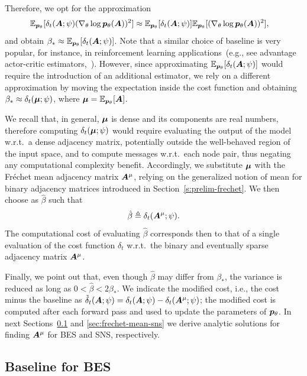 Therefore, we opt for the approximation  
\begin{align}
    \mathbb{E}_{{\bm{p}}_\theta}[\delta_t({\bm{A}};\psi)(\nabla_\theta\log{{\bm{p}}_\theta}({\bm{A}}))^{ 2}] 
    &\approx 
    \mathbb{E}_{{\bm{p}}_\theta}[\delta_t({\bm{A}};\psi)]\mathbb{E}_{{\bm{p}}_\theta}[(\nabla_\theta\log{{\bm{p}}_\theta}({\bm{A}}))^{ 2}],
\end{align}
and obtain $\beta_*\approx\mathbb{E}_{{\bm{p}}_\theta}[\delta_t({\bm{A}};\psi)]$. Note that a similar choice of baseline is very popular, for instance, in reinforcement learning applications~(e.g., see advantage actor-critic estimators,~\citealt{sutton1999policy, mnih2016asynchronous}). However, since approximating $\mathbb{E}_{{\bm{p}}_\theta}[\delta_t({\bm{A}};\psi)]$ would require the introduction of an additional estimator, we rely on a different approximation by moving the expectation inside the cost function and obtaining $\beta_*\approx\delta_t(\boldsymbol{\mu};\psi)$, where $\boldsymbol{\mu}=\mathbb{E}_{{\bm{p}}_\theta}[{\bm{A}}]$.

We recall that, in general, $\boldsymbol{\mu}$ is dense and its components are real numbers, therefore computing $\delta_t(\boldsymbol{\mu};\psi)$ would require evaluating the output of the model w.r.t.\ a dense adjacency matrix, potentially outside the well-behaved region of the input space, and to compute messages w.r.t.\ each node pair, thus negating any computational complexity benefit. Accordingly, we substitute $\boldsymbol{\mu}$ with the Fr\'echet mean adjacency matrix ${\bm{A}}^\mu$, relying on the generalized notion of mean for binary adjacency matrices introduced in Section~\ref{s:prelim-frechet}. We then choose as $\hat\beta$ such that 
\begin{equation}\label{eq:beta-hat}
\hat\beta \triangleq \delta_t({\bm{A}}^\mu;\psi).
\end{equation}
The computational cost of evaluating $\hat\beta$ corresponds then to that of a single evaluation of the cost function $\delta_t$ w.r.t.\ the binary and eventually sparse adjacency matrix ${\bm{A}}^\mu$.

Finally, we point out that, even though $\hat \beta$ may differ from $\beta_*$, the variance is reduced as long as $0<\hat\beta< 2\beta_*$. We indicate the modified cost, i.e., the cost minus the baseline as $\tilde{\delta}_t({\bm{A}};\psi)=\delta_t({\bm{A}};\psi) - \delta_t({\bm{A}}^\mu;\psi)$; the modified cost is computed after each forward pass and used to update the parameters of ${{\bm{p}}_\theta}$.
In next Sections~\ref{sec:frechet-mean-bes} and \ref{sec:frechet-mean-sns} we derive analytic solutions for finding ${\bm{A}}^\mu$ for BES and SNS, respectively.

\subsection{Baseline for BES}\label{sec:frechet-mean-bes}

